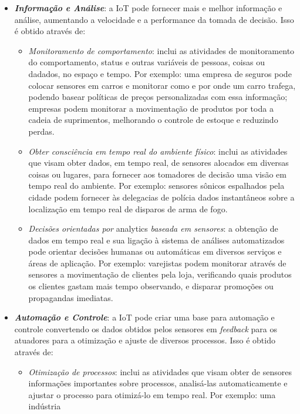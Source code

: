 \documentclass[pdftex, brazil, 12pt, twoside]{article}
\begin{document}
\begin{itemize}
\item \emph{\textbf{Informação e Análise}}: a IoT pode fornecer mais e melhor
  informação e análise, aumentando a velocidade e a performance da tomada de
  decisão. Isso é obtido através de:
  \begin{itemize}
  \item \emph{Monitoramento de comportamento}: inclui as atividades
    de monitoramento do comportamento, status e outras variáveis de pessoas,
    coisas ou dadados, no espaço e tempo. Por exemplo: uma empresa de seguros
    pode colocar sensores em carros e monitorar como e por onde um carro trafega,
    podendo basear políticas de preços personalizadas com essa informação; empresas
    podem monitorar a movimentação de produtos por toda a cadeia de suprimentos,
    melhorando o controle de estoque e reduzindo perdas.
  \item \emph{Obter consciência em tempo real do ambiente físico}: inclui as
    atividades que visam obter dados, em tempo real, de sensores alocados em
    diversas coisas ou lugares, para fornecer aos tomadores de decisão uma visão
    em tempo real do ambiente. Por exemplo: sensores sônicos espalhados pela cidade
    podem fornecer às delegacias de polícia dados instantâneos sobre a localização
    em tempo real de disparos de arma de fogo.
  \item \emph{Decisões orientadas por} analytics \emph{baseada em sensores}: a
    obtenção de dados em tempo real e sua ligação à sistema de análises automatizados
    pode orientar decisões humanas ou automáticas em diversos serviços e áreas de
    aplicação. Por exemplo: varejistas podem monitorar através de sensores a
    movimentação de clientes pela loja, verificando quais produtos os clientes
    gastam mais tempo observando, e disparar promoções ou propagandas imediatas.
  \end{itemize}
\item \emph{\textbf{Automação e Controle}}: a IoT pode criar uma base para
  automação e controle convertendo os dados obtidos pelos sensores em \emph{feedback}
  para os atuadores para a otimização e ajuste de diversos processos. Isso é obtido
  através de:
  \begin{itemize}
  \item \emph{Otimização de processos}: inclui as atividades que visam obter
    de sensores informações importantes sobre processos, analisá-las automaticamente
    e ajustar o processo para otimizá-lo em tempo real. Por exemplo: uma indústria

\end{itemize}
\end{itemize}
\end{document}
